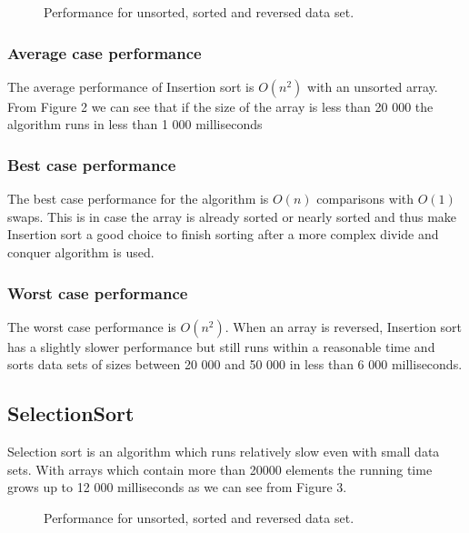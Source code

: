 \documentclass{acm_proc_article-sp}
\begin{document}
\begin{figure}[!htb]
\caption{Performance for unsorted, sorted and reversed data set.}
\end{figure}

\subsubsection{Average case performance}

The average performance of Insertion sort is $O(n^{2})$ with an unsorted array. From Figure 2 we can see that if the size of the array is less than 20 000 the algorithm runs in less than 1 000 milliseconds

\subsubsection{Best case performance}

The best case performance for the algorithm is $O(n)$ comparisons with $O(1)$ swaps. This is in case the array is already sorted or nearly sorted and thus make Insertion sort a good choice to finish sorting after a more complex divide and conquer algorithm is used.

\subsubsection{Worst case performance}

The worst case performance is $O(n^{2})$. When an array is reversed, Insertion sort has a slightly slower performance but still runs within a reasonable time and sorts data sets of sizes between 20 000 and 50 000 in less than 6 000 milliseconds.

\subsection{SelectionSort}

Selection sort is an algorithm which runs relatively slow even with small data sets. With arrays which contain more than 20000 elements the running time grows up to 12 000 milliseconds as we can see from Figure 3.

\begin{figure}[!htb]
\caption{Performance for unsorted, sorted and reversed data set.}
\end{figure}
\end{document}
